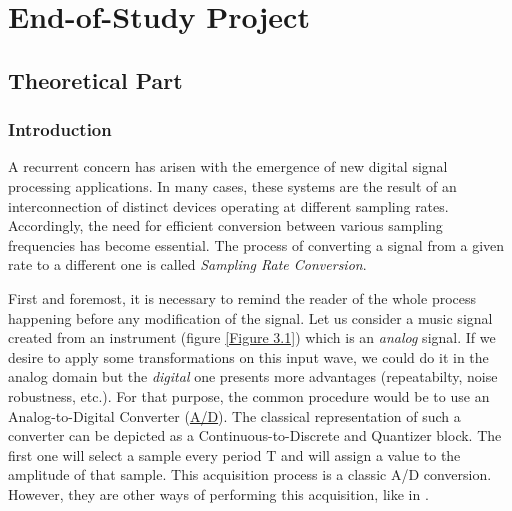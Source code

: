 
\chapter{End-of-Study Project} %

\label{Chapter3} %


\newcommand{\keyword}[1]{\textbf{#1}}
\newcommand{\tabhead}[1]{\textbf{#1}}
\newcommand{\code}[1]{\texttt{#1}}
\newcommand{\file}[1]{\texttt{\bfseries#1}}
\newcommand{\option}[1]{\texttt{\itshape#1}}


\section{Theoretical Part}


\subsection{Introduction}
A recurrent concern has arisen with the emergence of new digital signal processing applications. In many cases, these systems are the result of an interconnection of distinct devices operating at different sampling rates. Accordingly, the need for efficient conversion between various sampling frequencies has become essential. The process of converting a signal from a given rate to a different one is called \textit{Sampling Rate Conversion}.

First and foremost, it is necessary to remind the reader of the whole process happening before any modification of the signal. Let us consider a music signal created from an instrument (figure \ref{Figure 3.1}) which is an \textit{analog} signal. If we desire to apply some transformations on this input wave, we could do it in the analog domain but the \textit{digital} one presents more advantages (repeatabilty, noise robustness, etc.). For that purpose, the common procedure would be to use an Analog-to-Digital Converter (\hyperlink{A/D}{A/D}). The classical representation of such a converter can be depicted as a Continuous-to-Discrete and Quantizer block. The first one will select a sample every period T and  will assign a value to the amplitude of that sample. This acquisition process is a classic A/D conversion. However, they are other ways of performing this acquisition, like in \cite{AmpSamp}.


